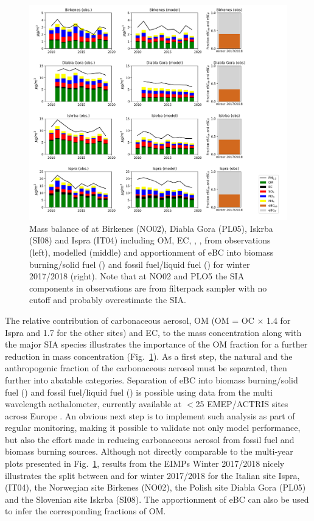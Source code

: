 \begin{figure}
\includegraphics[width=16cm]{FIGS_TRENDS/Composition_4sites.png}
 \caption{
  Mass balance of \pmfine at  Birkenes (NO02), Diabla Gora
  (PL05), Iskrba (SI08) and Ispra (IT04) including OM, EC, , ,  from 
  observations (left), modelled (middle) and apportionment of eBC
  into biomass burning/solid fuel (\EBCff) and fossil fuel/liquid fuel
  (\EBCbb) for winter 2017/2018 (right). Note that at NO02 and PLO5 the SIA components in observations are from filterpack sampler with no cutoff and probably overestimate the \pmfine SIA. \label{fig:KEX4}
 }
\end{figure}


The relative contribution of carbonaceous aerosol, OM (OM = OC $\times$
1.4 for Ispra and 1.7 for the other sites)
 and EC, to the \pmfine mass concentration along with the major
SIA species illustrates the importance of the OM fraction for a further
reduction in \pmfine mass concentration (Fig.~\ref{fig:KEX4}). As a first step,
the natural and the anthropogenic fraction of the carbonaceous aerosol
must be separated, then further into abatable categories. Separation of
eBC into biomass burning/solid fuel (\EBCbb) and fossil fuel/liquid fuel
(\EBCff) is possible using data from the multi wavelength aethalometer,
currently available at $<$25 EMEP/ACTRIS sites across Europe \citep{Platt20XX}
. An obvious next
step is to implement such analysis as part of regular monitoring,
making it possible to validate not only model performance, but also the
effort made in reducing carbonaceous aerosol from fossil fuel and biomass
burning sources. Although not directly comparable to the multi-year plots
presented in Fig.~\ref{fig:KEX4}, results from the EIMPs Winter 2017/2018 nicely
illustrates the split between \EBCbb and \EBCff for winter 2017/2018 for
the Italian site Ispra, (IT04), the Norwegian site Birkenes (NO02), the
Polish site Diabla Gora (PL05) and the Slovenian site Iskrba (SI08). The
apportionment of eBC can also be used to infer the corresponding fractions
of OM.

